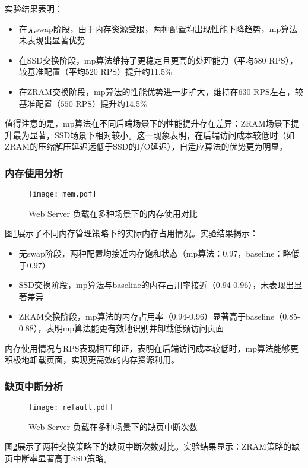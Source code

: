 实验结果表明：
\begin{itemize}
    \item 在无swap阶段，由于内存资源受限，两种配置均出现性能下降趋势，mp算法未表现出显著优势
    \item 在SSD交换阶段，mp算法维持了更稳定且更高的处理能力（平均$580$ RPS），较基准配置（平均$520$ RPS）提升约11.5\%
    \item 在ZRAM交换阶段，mp算法的性能优势进一步扩大，维持在$630$ RPS左右，较基准配置（$550$ RPS）提升约14.5\%
\end{itemize}

值得注意的是，mp算法在不同后端场景下的性能提升存在差异：ZRAM场景下提升最为显著，SSD场景下相对较小。这一现象表明，在后端访问成本较低时（如ZRAM的压缩解压延迟远低于SSD的I/O延迟），自适应算法的优势更为明显。

\subsubsection{内存使用分析}
\begin{figure}[htbp]
    \centering
    \texttt{[image: mem.pdf]}
    \caption{Web Server 负载在多种场景下的内存使用对比}
    \label{fig:mem}
\end{figure}
图\ref{fig:mem}展示了不同内存管理策略下的实际内存占用情况。实验结果揭示：
\begin{itemize}
    \item 无swap阶段，两种配置均接近内存饱和状态（mp算法：0.97，baseline：略低于0.97）
    \item SSD交换阶段，mp算法与baseline的内存占用率接近（0.94-0.96），未表现出显著差异
    \item ZRAM交换阶段，mp算法的内存占用率（0.94-0.96）显著高于baseline（0.85-0.88），表明mp算法能更有效地识别并卸载低频访问页面
\end{itemize}

内存使用情况与RPS表现相互印证，表明在后端访问成本较低时，mp算法能够更积极地卸载页面，实现更高效的内存资源利用。

\subsubsection{缺页中断分析}
\begin{figure}[htb]
    \centering
    \texttt{[image: refault.pdf]}
    \caption{Web Server 负载在多种场景下的缺页中断次数}
    \label{fig:refault}
\end{figure}
图\ref{fig:refault}展示了两种交换策略下的缺页中断次数对比。实验结果显示：ZRAM策略的缺页中断率显著高于SSD策略。

